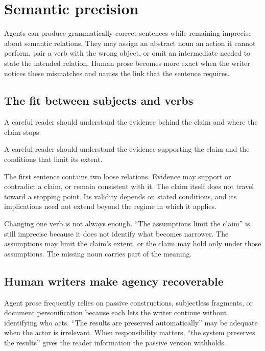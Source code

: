 \section{Semantic precision}
\label{sec:directness}

Agents can produce grammatically correct sentences while remaining imprecise
about semantic relations. They may assign an abstract noun an action it cannot
perform, pair a verb with the wrong object, or omit an intermediate needed to
state the intended relation. Human prose becomes more exact when the writer
notices these mismatches and names the link that the sentence requires.

\subsection{The fit between subjects and verbs}

\agentdraft

A careful reader should understand the evidence behind the claim and where the
claim stops.

\humanrevision

A careful reader should understand the evidence supporting the claim and the
conditions that limit its extent.

The first sentence contains two loose relations. Evidence may support or
contradict a claim, or remain consistent with it. The claim itself does not
travel toward a stopping point. Its validity depends on stated conditions, and
its implications need not extend beyond the regime in which it applies.

Changing one verb is not always enough. ``The assumptions limit the claim'' is
still imprecise because it does not identify what becomes narrower. The
assumptions may limit the claim's extent, or the claim may hold only under
those assumptions. The missing noun carries part of the meaning.

\subsection{Human writers make agency recoverable}

Agent prose frequently relies on passive constructions, subjectless fragments,
or document personification because each lets the writer continue without
identifying who acts. ``The results are preserved automatically'' may be adequate
when the actor is irrelevant. When responsibility matters, ``the system
preserves the results'' gives the reader information the passive version
withholds.

